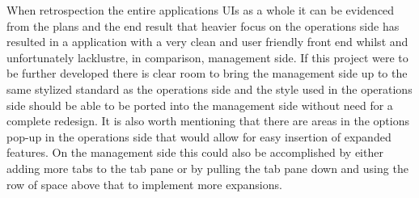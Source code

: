 When retrospection the entire applications UIs as a whole it can be evidenced from the plans and the end result that heavier focus on the operations side has resulted in a application with a very clean and user friendly front end whilst and unfortunately lacklustre, in comparison, management side. If this project were to be further developed there is clear room to bring the management side up to the same stylized standard as the operations side and the style used in the operations side should be able to be ported into the management side without need for a complete redesign. It is also worth mentioning that there are areas in the options pop-up in the operations side that would allow for easy insertion of expanded features. On the management side this could also be accomplished by either adding more tabs to the tab pane or by pulling the tab pane down and using the row of space above that to implement more expansions.